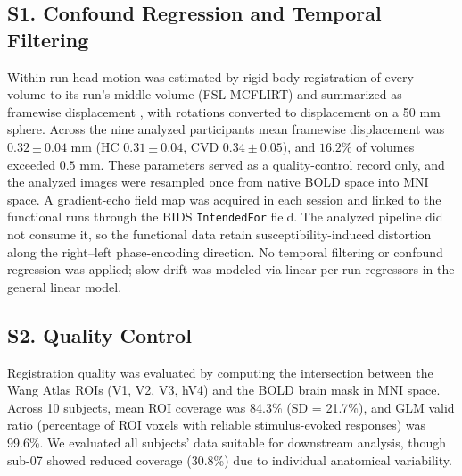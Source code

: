\renewcommand{\thetable}{S\arabic{table}}\setcounter{table}{0}


\subsection*{\textbf{S1. Confound Regression and Temporal Filtering}}

Within-run head motion was estimated by rigid-body registration of every volume to its run's middle volume (FSL MCFLIRT) and summarized as framewise displacement \cite{power2012}, with rotations converted to displacement on a 50 mm sphere.
Across the nine analyzed participants mean framewise displacement was $0.32 \pm 0.04$ mm (HC $0.31 \pm 0.04$, CVD $0.34 \pm 0.05$), and $16.2\%$ of volumes exceeded $0.5$ mm.
These parameters served as a quality-control record only, and the analyzed images were resampled once from native BOLD space into MNI space.
A gradient-echo field map was acquired in each session and linked to the functional runs through the BIDS \texttt{IntendedFor} field. The analyzed pipeline did not consume it, so the functional data retain susceptibility-induced distortion along the right--left phase-encoding direction.
No temporal filtering or confound regression was applied; slow drift was modeled via linear per-run regressors in the general linear model.



\subsection*{\textbf{S2. Quality Control}}

Registration quality was evaluated by computing the intersection between the Wang Atlas ROIs (V1, V2, V3, hV4) and the BOLD brain mask in MNI space.
Across 10 subjects, mean ROI coverage was 84.3\% (SD = 21.7\%), and GLM valid ratio (percentage of ROI voxels with reliable stimulus-evoked responses) was 99.6\%.
We evaluated all subjects' data suitable for downstream analysis, though sub-07 showed reduced coverage (30.8\%) due to individual anatomical variability.






